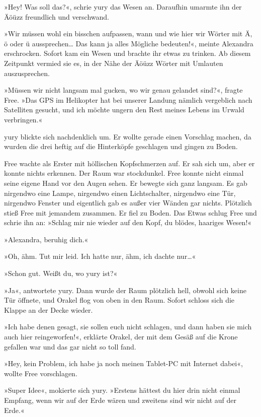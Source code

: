 »Hey! Was soll das?«, schrie yury das Wesen an. Daraufhin umarmte ihn der Äöüzz freundlich und verschwand.

»Wir müssen wohl ein bisschen aufpassen, wann und wie hier wir Wörter mit Ä, ö oder ü aussprechen… Das kann ja alles Mögliche bedeuten!«, meinte Alexandra erschrocken. Sofort kam ein Wesen und brachte ihr etwas zu trinken. Ab diesem Zeitpunkt vermied sie es, in der Nähe der Äöüzz Wörter mit Umlauten auszusprechen.

»Müssen wir nicht langsam mal gucken, wo wir genau gelandet sind?«, fragte Free. »Das GPS im Helikopter hat bei unserer Landung nämlich vergeblich nach Satelliten gesucht, und ich möchte ungern den Rest meines Lebens im Urwald verbringen.«

yury blickte sich nachdenklich um. Er wollte gerade einen Vorschlag machen, da wurden die drei heftig auf die Hinterköpfe geschlagen und gingen zu Boden.

Free wachte als Erster mit höllischen Kopfschmerzen auf. Er sah sich um, aber er konnte nichts erkennen. Der Raum war stockdunkel. Free konnte nicht einmal seine eigene Hand vor den Augen sehen. Er bewegte sich ganz langsam. Es gab nirgendwo eine Lampe, nirgendwo einen Lichtschalter, nirgendwo eine Tür, nirgendwo Fenster und eigentlich gab es außer vier Wänden gar nichts. Plötzlich stieß Free mit jemandem zusammen. Er fiel zu Boden. Das Etwas schlug Free und schrie ihn an: »Schlag mir nie wieder auf den Kopf, du blödes, haariges Wesen!«

»Alexandra, beruhig dich.«

»Oh, ähm. Tut mir leid. Ich hatte nur, ähm, ich dachte nur…«

»Schon gut. Weißt du, wo yury ist?«

»Ja«, antwortete yury. Dann wurde der Raum plötzlich hell, obwohl sich keine Tür öffnete, und Orakel flog von oben in den Raum. Sofort schloss sich die Klappe an der Decke wieder.

»Ich habe denen gesagt, sie sollen euch nicht schlagen, und dann haben sie mich auch hier reingeworfen!«, erklärte Orakel, der mit dem Gesäß auf die Krone gefallen war und das gar nicht so toll fand.

»Hey, kein Problem, ich habe ja noch meinen Tablet-PC mit Internet dabei«, wollte Free vorschlagen.

»Super Idee«, mokierte sich yury. »Erstens hättest du hier drin nicht einmal Empfang, wenn wir auf der Erde wären und zweitens sind wir nicht auf der Erde.«


